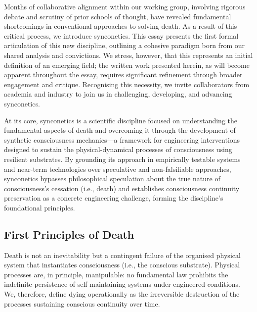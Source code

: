 \documentclass[10pt]{article}
\begin{document}
\begin{sloppypar}
  Months of collaborative alignment within our working group, involving rigorous debate and scrutiny of prior schools of thought, have revealed fundamental shortcomings in conventional approaches to solving death. As a result of this critical process, we introduce synconetics. This essay presents the first formal articulation of this new discipline, outlining a cohesive paradigm born from our shared analysis and convictions. We stress, however, that this represents an initial definition of an emerging field; the written work presented herein, as will become apparent throughout the essay, requires significant refinement through broader engagement and critique. Recognising this necessity, we invite collaborators from academia and industry to join us in challenging, developing, and advancing synconetics.

  At its core, synconetics is a scientific discipline focused on understanding the fundamental aspects of death and overcoming it through the development of synthetic consciousness mechanics—a framework for engineering interventions designed to sustain the physical-dynamical processes of consciousness using resilient substrates. By grounding its approach in empirically testable systems and near-term technologies over speculative and non-falsifiable approaches, synconetics bypasses philosophical speculation about the true nature of consciousness’s cessation (i.e., death) and establishes consciousness continuity preservation as a concrete engineering challenge, forming the discipline’s foundational principles.

  \subsection{First Principles of Death}
  \label{sec:first-principles}

  Death is not an inevitability but a contingent failure of the organised physical system that instantiates consciousness (i.e., the conscious substrate). Physical processes are, in principle, manipulable: no fundamental law prohibits the indefinite persistence of self-maintaining systems under engineered conditions. We, therefore, define dying operationally as the irreversible destruction of the processes sustaining conscious continuity over time.


\end{sloppypar}
\end{document}
